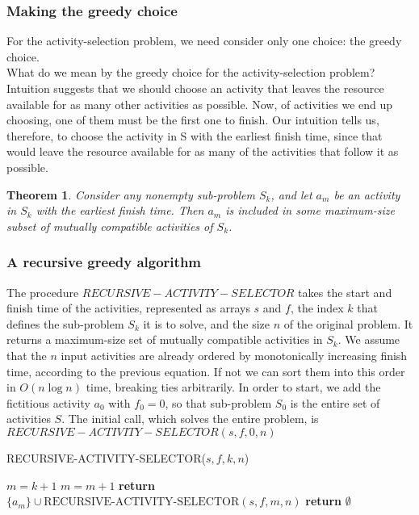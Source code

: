 \documentclass[12pt]{article}
\newtheorem{theorem}{Theorem}
\begin{document}
\subsubsection*{Making the greedy choice}

For the activity-selection problem, we need consider only one choice: the greedy choice. \\

What do we mean by the greedy choice for the activity-selection problem? Intuition suggests that we should choose an activity that leaves the resource available for as many other activities as possible. Now, of activities we end up choosing, one of them must be the first one to finish. Our intuition tells us, therefore, to choose the activity in S with the earliest finish time, since that would leave the resource available for as many of the activities that follow it as possible. \\

\begin{theorem}
  Consider any nonempty sub-problem $S_k$, and let $a_m$ be an activity in $S_k$ with the earliest finish time. Then $a_m$ is included in some maximum-size subset of mutually compatible activities of $S_k$.
\end{theorem}

\subsubsection*{A recursive greedy algorithm}

The procedure $RECURSIVE-ACTIVITY-SELECTOR$ takes the start and finish time of the activities, represented as arrays $s$ and $f$, the index $k$ that defines the sub-problem $S_k$ it is to solve, and the size $n$ of the original problem. It returns a maximum-size set of mutually compatible activities in $S_k$. We assume that the $n$ input activities are already ordered by monotonically increasing finish time, according to the previous equation. If not we can sort them into this order in $O(n \log n)$ time, breaking ties arbitrarily. In order to start, we add the fictitious activity $a_0$ with $f_0 = 0$, so that sub-problem $S_0$ is the entire set of activities $S$. The initial call, which solves the entire problem, is $RECURSIVE-ACTIVITY-SELECTOR(s, f, 0, n)$

RECURSIVE-ACTIVITY-SELECTOR($s, f, k, n$)
\begin{algorithmic}[1]
\State $m = k + 1$
	\State $m = m + 1$
\EndWhile
{}
	\State \textbf{return } $\{ a_m\} \cup \text{RECURSIVE-ACTIVITY-SELECTOR}(s, f, m, n)$
\Else
	\State \textbf{return } $\emptyset$
\EndIf
\end{algorithmic}
\end{document}
